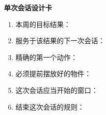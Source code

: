 \begin{templatebox}
\textbf{单次会话设计卡}
\begin{enumerate}[nosep]
  \item 本周的目标结果：
  \item 服务于该结果的下一次会话：
  \item 精确的第一个动作：
  \item 必须提前摆放好的物件：
  \item 这次会话应当开始的窗口：
  \item 结束这次会话的规则：
\end{enumerate}
\end{templatebox}